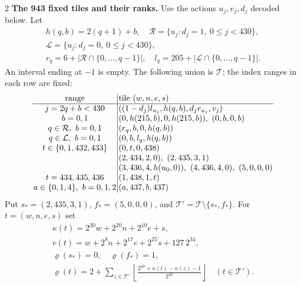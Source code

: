 \documentclass[10pt]{article}
\newcommand{\fl}[1]{\left\lfloor#1\right\rfloor}
\newcommand{\rg}[2]{\{#1,\ldots,#2\}}
\begin{document}
\begin{multicols}{2}
\textbf{The 943 fixed tiles and their ranks.}
Use the actions $u_j,v_j,d_j$ decoded below. Let
\[
\begin{gathered}
h(q,b)=2(q+1)+b,\quad
\mathcal R=\{u_j:d_j=1,\ 0\le j<430\},\\
\mathcal L=\{u_j:d_j=0,\ 0\le j<430\},\\
r_q=6+|\mathcal R\cap\rg0{q-1}|,\quad
l_q=205+|\mathcal L\cap\rg0{q-1}|.
\end{gathered}
\]
An interval ending at $-1$ is empty. The following union is $\mathcal T$;
the index ranges in each row are fixed:
\[
\setlength{\arraycolsep}{1.4pt}\begin{array}{c|l}
\text{range}&\text{tile }(w,n,e,s)\\\hline
j=2q+b<430&((1-d_j)l_{u_j},h(q,b),d_jr_{u_j},v_j)\\
b=0,1&(0,h(215,b),0,h(215,b)),\ (0,b,0,b)\\
q\in\mathcal R,\ b=0,1&(r_q,b,0,h(q,b))\\
q\in\mathcal L,\ b=0,1&(0,b,l_q,h(q,b))\\
t\in\{0,1,432,433\}&(0,t,0,438)\\
&(2,434,2,0),\ (2,435,3,1)\\
&(3,436,4,h(u_0,0)),\ (4,436,4,0),\ (5,0,0,0)\\
t=434,435,436&(1,438,1,t)\\
a\in\{0,1,4\},\ b=0,1,2&(a,437,b,437)
\end{array}
\]
Put $s_*=(2,435,3,1)$, $f_*=(5,0,0,0)$, and $\mathcal T'=\mathcal T\setminus\{s_*,f_*\}$.
For $t=(w,n,e,s)$ set
\[
\begin{gathered}
\kappa(t)=2^{30}w+2^{20}n+2^{10}e+s,\\
v(t)=w+2^8n+2^{17}e+2^{25}s+127\,2^{34},\\
\varrho(s_*)=0,\quad\varrho(f_*)=1,\\
\varrho(t)=2+\sum_{z\in\mathcal T'}
 \fl{\frac{2^{40}+\kappa(t)-\kappa(z)-1}{2^{40}}}
 \quad(t\in\mathcal T').
\end{gathered}
\]


\end{multicols}
\end{document}
